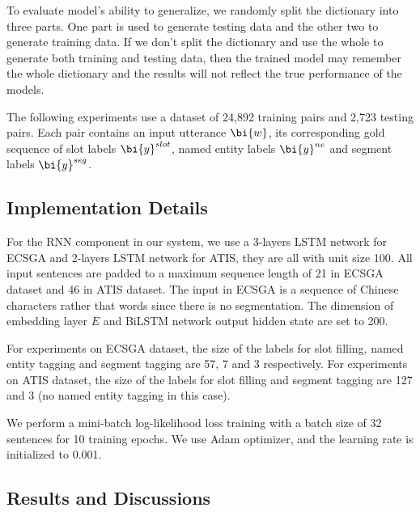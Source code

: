 To evaluate model's ability to generalize, 
we randomly split the dictionary into three parts.
One part is used to generate testing data and the other two 
to generate training data.
If we don't split the dictionary and use the whole to generate 
both training and testing data,
then the trained model may remember the whole dictionary and 
the results will not reflect the true performance of the models.

The following experiments use a dataset of 24,892 training pairs
and 2,723 testing pairs.
Each pair contains an input utterance $\bi{w}$, 
its corresponding gold sequence of slot labels $\bi{y}^{slot}$,
named entity labels $\bi{y}^{ne}$ and segment labels $\bi{y}^{seg}$.

\subsection{Implementation Details}
For the RNN component in our system,
we use a 3-layers LSTM network for ECSGA and 2-layers LSTM network for ATIS,
they are all with unit size 100.
All input sentences are padded to a maximum sequence length of 21 in ECSGA dataset and 46 in ATIS dataset.
The input in ECSGA is a sequence of Chinese characters rather that words 
since there is no segmentation.
The dimension of embedding layer $E$ 
and BiLSTM network output hidden state are set to 200.

For experiments on ECSGA dataset, the size of the labels for slot filling,
named entity tagging and segment tagging are 57, 7 and 3 respectively.
For experiments on ATIS dataset, the size of the labels for slot filling and 
segment tagging are 127 and 3 (no named entity tagging in this case).

We perform a mini-batch log-likelihood loss training with a batch size of 
32 sentences for 10 training epochs.
We use Adam optimizer, and the learning rate is initialized to 0.001.

\subsection{Results and Discussions}
\label{sec:eval}

